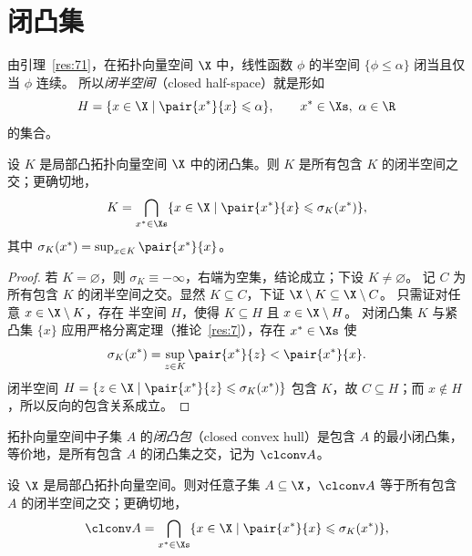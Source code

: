 \section{闭凸集}

由引理~\ref{res:71}，在拓扑向量空间 $\X$ 中，线性函数 $\phi$ 的半空间 $\{\phi\leqslant\alpha\}$ 闭当且仅当 $\phi$ 连续。
所以\emph{闭半空间}（closed half-space）就是形如
\[
  H=\{x\in\X\mid\pair{x^*}{x}\leqslant\alpha\},\qquad x^*\in\Xs,\ \alpha\in\R
\]
的集合。

\begin{proposition}
\label{res:9}
设 $K$ 是局部凸拓扑向量空间 $\X$ 中的闭凸集。则 $K$ 是所有包含 $K$ 的闭半空间之交；更确切地，
\begin{equation}
  \label{eq:2}
  K=\bigcap_{x^*\in\Xs}\{x\in\X\mid\pair{x^*}{x}\leqslant\sigma_K(x^*)\},
\end{equation}
其中 $\sigma_K(x^*)=\sup_{x\in K}\pair{x^*}{x}$。
\end{proposition}

\begin{proof}
若 $K=\varnothing$，则 $\sigma_K\equiv-\infty$，右端为空集，结论成立；下设 $K\neq\varnothing$。
记 $C$ 为所有包含 $K$ 的闭半空间之交。显然 $K\subseteq C$，下证 $\X\setminus K\subseteq\X\setminus C$。
只需证对任意 $x\in\X\setminus K$，存在 半空间 $H$，使得 $K\subseteq H$ 且 $x\in\X\setminus H$。
对闭凸集 $K$ 与紧凸集 $\{x\}$ 应用严格分离定理（推论~\ref{res:7}），存在 $x^*\in\Xs$ 使
\[
  \sigma_K(x^*)=\sup_{z\in K}\pair{x^*}{z}<\pair{x^*}{x}.
\]
闭半空间 $H=\{z\in\X\mid\pair{x^*}{z}\leqslant\sigma_K(x^*)\}$ 包含 $K$，故 $C\subseteq H$；而 $x\notin H$，所以反向的包含关系成立。
\end{proof}

\begin{definition}[闭凸包]
\label{def:7}
拓扑向量空间中子集 $A$ 的\emph{闭凸包}（closed convex hull）是包含 $A$ 的最小闭凸集，等价地，是所有包含 $A$ 的闭凸集之交，记为 $\clconv A$。
\end{definition}

\begin{corollary}
\label{res:10}
设 $\X$ 是局部凸拓扑向量空间。则对任意子集 $A\subseteq\X$，$\clconv A$ 等于所有包含 $A$ 的闭半空间之交；更确切地，
\begin{equation}
  \clconv A=\bigcap_{x^*\in\Xs}\{x\in\X\mid\pair{x^*}{x}\leqslant\sigma_K(x^*)\},
\end{equation}
\end{corollary}

